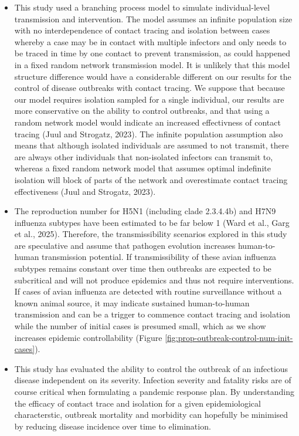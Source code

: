 \documentclass{article}
\begin{document}
\begin{itemize}
\item This study used a branching process model to simulate individual-level transmission and intervention. The model assumes an infinite population size with no interdependence of contact tracing and isolation between cases whereby a case may be in contact with multiple infectors and only needs to be traced in time by one contact to prevent transmission, as could happened in a fixed random network transmission model. It is unlikely that this model structure difference would have a considerable different on our results for the control of disease outbreaks with contact tracing. We suppose that because our model requires isolation sampled for a single individual, our results are more conservative on the ability to control outbreaks, and that using a random network model would indicate an increased effectivness of contact tracing (Juul and Strogatz, 2023). The infinite population assumption also means that although isolated individuals are assumed to not transmit, there are always other individuals that non-isolated infectors can transmit to, whereas a fixed random network model that assumes optimal indefinite isolation will block of parts of the network and overestimate contact tracing effectiveness (Juul and Strogatz, 2023).
\item The reproduction number for H5N1 (including clade 2.3.4.4b) and H7N9 influenza subtypes have been estimated to be far below 1 (Ward et al., Garg et al., 2025). Therefore, the transmissibility scenarios explored in this study are speculative and assume that pathogen evolution increases human-to-human transmission potential. If transmissibility of these avian influenza subtypes remains constant over time then outbreaks are expected to be subcritical and will not produce epidemics and thus not require interventions. If cases of avian influenza are detected with routine surveillance without a known animal source, it may indicate sustained human-to-human transmission and can be a trigger to commence contact tracing and isolation while the number of initial cases is presumed small, which as we show increases epidemic controllability (Figure \ref{fig:prop-outbreak-control-num-init-cases}).
\item This study has evaluated the ability to control the outbreak of an infectious disease independent on its severity. Infection severity and fatality risks are of course critical when formulating a pandemic response plan. By understanding the efficacy of contact trace and isolation for a given epidemiological characterstic, outbreak mortality and morbidity can hopefully be minimised by reducing disease incidence over time to elimination.
\end{itemize}
\end{document}
